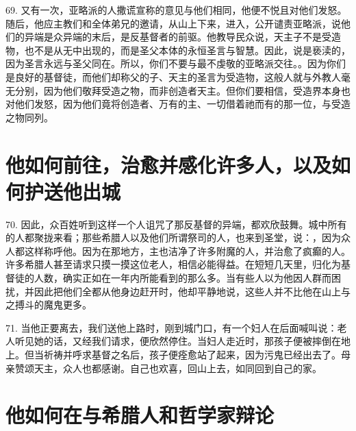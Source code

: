 69. 又有一次，亚略派的人撒谎宣称的意见与他们相同，他便不悦且对他们发怒。随后，他应主教们和全体弟兄的邀请，从山上下来，进入，公开谴责亚略派，说他们的异端是众异端的末后，是反基督者的前驱。他教导民众说，天主子不是受造物，也不是从无中出现的，而是圣父本体的永恒圣言与智慧。因此，说是亵渎的，因为圣言永远与圣父同在。所以，你们不要与最不虔敬的亚略派交往。。因为你们是良好的基督徒，而他们却称父的子、天主的圣言为受造物，这般人就与外教人毫无分别，因为他们敬拜受造之物，而非创造者天主。但你们要相信，受造界本身也对他们发怒，因为他们竟将创造者、万有的主、一切借着祂而有的那一位，与受造之物同列。\par


\section{他如何前往，治愈并感化许多人，以及如何护送他出城}

70. 因此，众百姓听到这样一个人诅咒了那反基督的异端，都欢欣鼓舞。城中所有的人都聚拢来看；那些希腊人以及他们所谓祭司的人，也来到圣堂，说：，因为众人都这样称呼他。因为在那地方，主也洁净了许多附魔的人，并治愈了疯癫的人。许多希腊人甚至请求只摸一摸这位老人，相信必能得益。在短短几天里，归化为基督徒的人数，确实正如在一年内所能看到的那么多。当有些人以为他因人群而困扰，并因此把他们全都从他身边赶开时，他却平静地说，这些人并不比他在山上与之搏斗的魔鬼更多。\par

71. 当他正要离去，我们送他上路时，刚到城门口，有一个妇人在后面喊叫说：老人听见她的话，又经我们请求，便欣然停住。当妇人走近时，那孩子便被摔倒在地上。但当祈祷并呼求基督之名后，孩子便痊愈站了起来，因为污鬼已经出去了。母亲赞颂天主，众人也都感谢。自己也欢喜，回山上去，如同回到自己的家。\par


\section{他如何在与希腊人和哲学家辩论}

